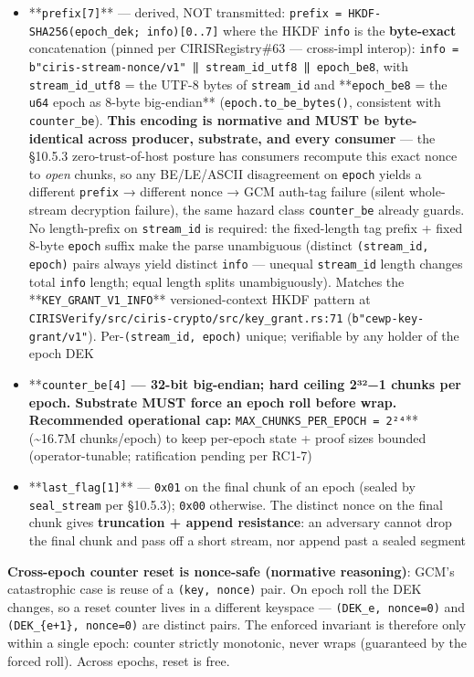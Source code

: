 \documentclass[11pt]{article}
\begin{document}
\begin{itemize}\setlength\itemsep{0pt}
\item **\texttt{prefix[7]}** — derived, NOT transmitted: \texttt{prefix = HKDF-SHA256(epoch\_dek; info)[0..7]} where the HKDF \texttt{info} is the \textbf{byte-exact} concatenation (pinned per CIRISRegistry\#63 — cross-impl interop): \texttt{info = b"ciris-stream-nonce/v1" ‖ stream\_id\_utf8 ‖ epoch\_be8}, with \texttt{stream\_id\_utf8} = the UTF-8 bytes of \texttt{stream\_id} and **\texttt{epoch\_be8} = the \texttt{u64} epoch as 8-byte big-endian** (\texttt{epoch.to\_be\_bytes()}, consistent with \texttt{counter\_be}). \textbf{This encoding is normative and MUST be byte-identical across producer, substrate, and every consumer} — the §10.5.3 zero-trust-of-host posture has consumers recompute this exact nonce to \textit{open} chunks, so any BE/LE/ASCII disagreement on \texttt{epoch} yields a different \texttt{prefix} → different nonce → GCM auth-tag failure (silent whole-stream decryption failure), the same hazard class \texttt{counter\_be} already guards. No length-prefix on \texttt{stream\_id} is required: the fixed-length tag prefix + fixed 8-byte \texttt{epoch} suffix make the parse unambiguous (distinct \texttt{(stream\_id, epoch)} pairs always yield distinct \texttt{info} — unequal \texttt{stream\_id} length changes total \texttt{info} length; equal length splits unambiguously). Matches the **\texttt{KEY\_GRANT\_V1\_INFO}** versioned-context HKDF pattern at \texttt{CIRISVerify/src/ciris-crypto/src/key\_grant.rs:71} (\texttt{b"cewp-key-grant/v1"}). Per-\texttt{(stream\_id, epoch)} unique; verifiable by any holder of the epoch DEK
\item **\texttt{counter\_be[4]}\textbf{ — 32-bit big-endian; hard ceiling 2³²−1 chunks per epoch. Substrate MUST force an epoch roll before wrap. Recommended operational cap: }\texttt{MAX\_CHUNKS\_PER\_EPOCH = 2²⁴}** (\textasciitilde{}16.7M chunks/epoch) to keep per-epoch state + proof sizes bounded (operator-tunable; ratification pending per RC1-7)
\item **\texttt{last\_flag[1]}** — \texttt{0x01} on the final chunk of an epoch (sealed by \texttt{seal\_stream} per §10.5.3); \texttt{0x00} otherwise. The distinct nonce on the final chunk gives \textbf{truncation + append resistance}: an adversary cannot drop the final chunk and pass off a short stream, nor append past a sealed segment
\end{itemize}


\textbf{Cross-epoch counter reset is nonce-safe (normative reasoning)}: GCM's catastrophic case is reuse of a \texttt{(key, nonce)} pair. On epoch roll the DEK changes, so a reset counter lives in a different keyspace — \texttt{(DEK\_e, nonce=0)} and \texttt{(DEK\_\{e+1\}, nonce=0)} are distinct pairs. The enforced invariant is therefore only within a single epoch: counter strictly monotonic, never wraps (guaranteed by the forced roll). Across epochs, reset is free.
\end{document}

